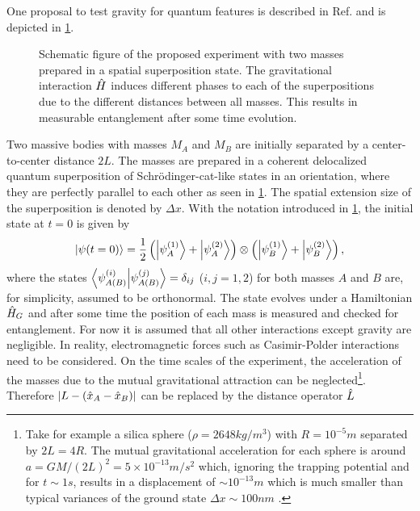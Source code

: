 One proposal to test gravity for quantum features is described in Ref. \cite{Bose_2017} and is depicted in \cref{fig:2:simple-problem}.
\begin{figure}[!htbp]
  \centering
  \def\svgwidth{\textwidth}
  
  \caption{Schematic figure of the proposed experiment with two masses prepared in a spatial superposition state. The gravitational interaction $\hat{H}$ induces different phases to each of the superpositions due to the different distances between all masses. This results in measurable entanglement after some time evolution.}
  \label{fig:2:simple-problem}
\end{figure}
Two massive bodies with masses $M_A$ and $M_B$ are initially separated by a center-to-center distance $2L$. 
The masses are prepared in a coherent delocalized quantum superposition of Schrödinger-cat-like states in an orientation, where they are perfectly parallel to each other as seen in \cref{fig:2:simple-problem}.
The spatial extension size of the superposition is denoted by $\Delta x$.
With the notation introduced in \cref{fig:2:simple-problem}, the initial state at $t=0$ is given by
\begin{equation}\label{eq:2:initial-state}
  \ket{\psi(t=0)} = \frac{1}{2}\left( \ket{\psi_A^{(1)}} + \ket{\psi_A^{(2)}} \right) \otimes \left( \ket{\psi_B^{(1)}} + \ket{\psi_B^{(2)}} \right) ,
\end{equation}
where the states $\braket{\psi^{(i)}_{A(B)}}{\psi^{(j)}_{A(B)}}=\delta_{ij}$ ($i,j=1,2$) for both masses $A$ and $B$ are, for simplicity, assumed to be orthonormal.
The state evolves under a Hamiltonian $\hat{H}_G$ and after some time the position of each mass is measured and checked for entanglement.
For now it is assumed that all other interactions except gravity are negligible. In reality, electromagnetic forces such as Casimir-Polder interactions \cite{Casimir_1948, Casimir_1948a} need to be considered.
On the time scales of the experiment, the acceleration of the masses due to the mutual gravitational attraction can be neglected\footnote{Take for example a silica sphere ($\rho = 2648 \si{kg/m^3}$) with $R=10^{-5}\si{m}$ separated by $2L=4R$. The mutual gravitational acceleration for each sphere is around $a=GM/(2L)^2 = 5 \times 10^{-13}\si{m/s^2}$ which, ignoring the trapping potential and for $t\sim 1 \si{s}$, results in a displacement of $\sim 10^{-13}\si{m}$ which is much smaller than typical variances of the ground state $\Delta x \sim 100\si{nm}$ \cite{Fein_2019}.}.
Therefore $\left\lvert L-(\hat{x}_A - \hat{x}_B)\right\rvert$ can be replaced by the distance operator $\hat{L}$
